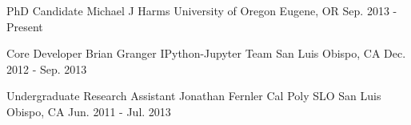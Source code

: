 
\begin{cvresearching}
  \cvresearch
    {PhD Candidate} %
    {Michael J Harms}
    {University of Oregon} %
    {Eugene, OR} %
    {Sep. 2013 - Present} %

  \cvresearch
    {Core Developer} %
    {Brian Granger}
    {IPython-Jupyter Team} %
    {San Luis Obispo, CA} %
    {Dec. 2012 - Sep. 2013} %

  \cvresearch
    {Undergraduate Research Assistant} %
    {Jonathan Fernler}
    {Cal Poly SLO} %
    {San Luis Obispo, CA} %
    {Jun. 2011 - Jul. 2013} %

\end{cvresearching}
